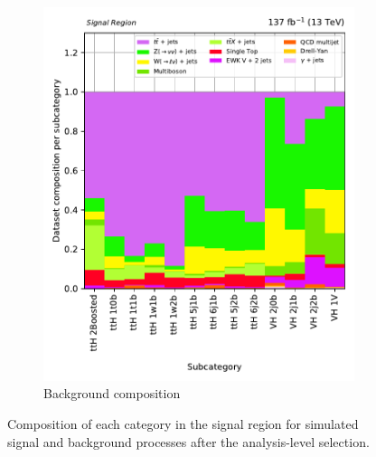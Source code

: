 \begin{figure}[htbp]
\begin{subfigure}[b]{0.4\textwidth}
        \includegraphics[width=\textwidth]{figures/region_plots/full_Run2/region_0/background_composition.pdf}
        \caption{Background composition}
    \end{subfigure}
    \caption[Composition of each category in the signal region for simulated signal and background processes after the analysis-level selection]{Composition of each category in the signal region for simulated signal and background processes after the analysis-level selection.}
    \label{fig:htoinv_sr_composition_comb2016to18}
\end{figure}
